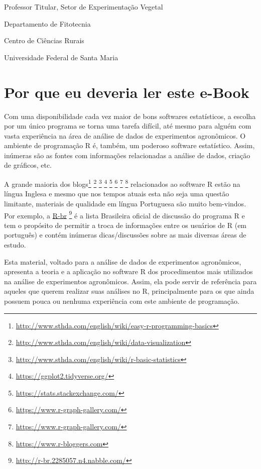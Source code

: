 \documentclass[
]{book}
\begin{document}
Professor Titular, Setor de Experimentação Vegetal

Departamento de Fitotecnia

Centro de Ciências Rurais

Universidade Federal de Santa Maria

\hypertarget{por-que-eu-deveria-ler-este-e-book}{%
\section*{Por que eu deveria ler este e-Book}\label{por-que-eu-deveria-ler-este-e-book}}

Com uma disponibilidade cada vez maior de bons softwares estatísticos, a escolha por um único programa se torna uma tarefa difícil, até mesmo para alguém com vasta experiência na área de análise de dados de experimentos agronômicos. O ambiente de programação R é, também, um poderoso software estatístico. Assim, inúmeras são as fontes com informações relacionadas a análise de dados, criação de gráficos, etc.

A grande maioria dos blogs\footnote{\url{http://www.sthda.com/english/wiki/easy-r-programming-basics}} \footnote{\url{http://www.sthda.com/english/wiki/data-visualization}} \footnote{\url{http://www.sthda.com/english/wiki/r-basic-statistics}} \footnote{\url{https://ggplot2.tidyverse.org/}} \footnote{\url{https://stats.stackexchange.com/}} \footnote{\url{https://www.r-graph-gallery.com/}} \footnote{\url{https://www.r-graph-gallery.com/}} \footnote{\url{https://www.r-bloggers.com}} relacionados ao software R estão na língua Inglesa e mesmo que nos tempos atuais esta não seja uma questão limitante, materiais de qualidade em língua Portuguesa são muito bem-vindos. Por exemplo, a \href{http://r-br.2285057.n4.nabble.com/}{R-br} \footnote{\url{http://r-br.2285057.n4.nabble.com/}} é a lista Brasileira oficial de discussão do programa R e tem o propósito de permitir a troca de informações entre os usuários de R (em português) e contém inúmeras dicas/discussões sobre as mais diversas áreas de estudo.

Esta material, voltado para a análise de dados de experimentos agronômicos, apresenta a teoria e a aplicação no software R dos procedimentos mais utilizados na análise de experimentos agronômicos. Assim, ela pode servir de referência para aqueles que querem realizar suas análises no R, principalmente para os que ainda possuem pouca ou nenhuma experiência com este ambiente de programação.
\end{document}
